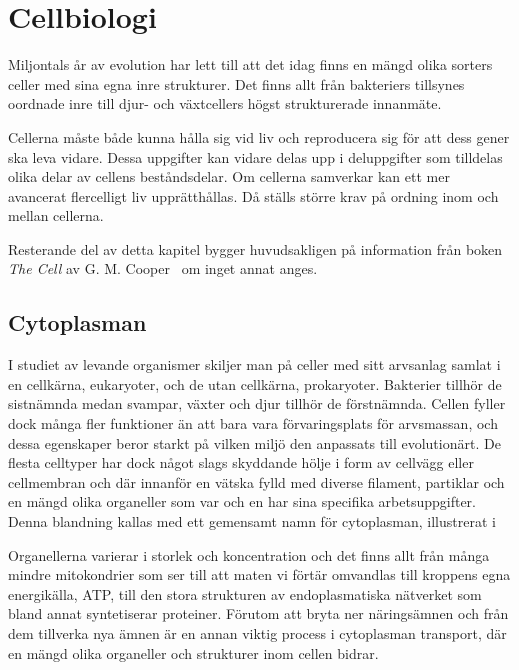 \chapter{Cellbiologi}

Miljontals år av evolution har lett till att det idag finns en mängd olika sorters celler med sina egna inre strukturer. Det finns allt från bakteriers tillsynes oordnade inre till djur- och växtcellers högst strukturerade innanmäte. 

Cellerna måste både kunna hålla sig vid liv och reproducera sig för att dess gener ska leva vidare. Dessa uppgifter kan vidare delas upp i deluppgifter som tilldelas olika delar av cellens beståndsdelar. Om cellerna samverkar kan ett mer avancerat flercelligt liv upprätthållas. Då ställs större krav på ordning inom och mellan cellerna.

Resterande del av detta kapitel bygger huvudsakligen på information från boken \emph{The Cell} av G. M.  Cooper~\cite{Cooper_TheCell2000} om inget annat anges.


\section{Cytoplasman}
I studiet av levande organismer skiljer man på celler med sitt arvsanlag samlat i en cellkärna, eukaryoter, och de utan cellkärna, prokaryoter. Bakterier tillhör de sistnämnda medan svampar, växter och djur tillhör de förstnämnda. Cellen fyller dock många fler funktioner än att bara vara förvaringsplats för arvsmassan, och dessa egenskaper beror starkt på vilken miljö den anpassats till evolutionärt. De flesta celltyper har dock något slags skyddande hölje i form av cellvägg eller cellmembran och där innanför en vätska fylld med diverse filament, partiklar och en mängd olika organeller som var och en har sina specifika arbetsuppgifter. Denna blandning kallas med ett gemensamt namn för cytoplasman, illustrerat i 

Organellerna varierar i storlek och koncentration och det finns allt från många mindre mitokondrier som ser till att maten vi förtär omvandlas till kroppens egna energikälla, ATP, till den stora strukturen av endoplasmatiska nätverket som bland annat syntetiserar proteiner. Förutom att bryta ner näringsämnen och från dem tillverka nya ämnen är en annan viktig process i cytoplasman transport, där en mängd olika organeller och strukturer inom cellen bidrar.


